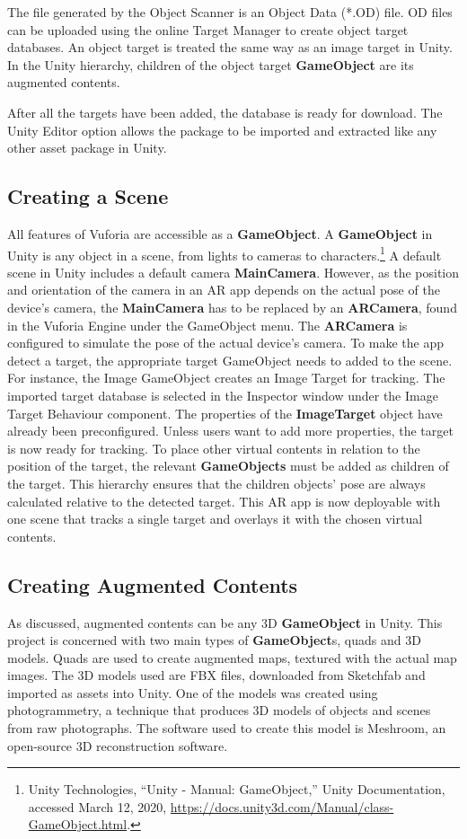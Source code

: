 The file generated by the Object Scanner is an Object Data (*.OD) file. OD files can be uploaded using the online Target Manager to create object target databases. An object target is treated the same way as an image target in Unity. In the Unity hierarchy, children of the object target \textbf{GameObject} are its augmented contents.

After all the targets have been added, the database is ready for download. The Unity Editor option allows the package to be imported and extracted like any other asset package in Unity.

\subsection{Creating a Scene}
All features of Vuforia are accessible as a \textbf{GameObject}. A \textbf{GameObject} in Unity is any object in a scene, from lights to cameras to characters.\footnote{Unity Technologies, “Unity - Manual: GameObject,” Unity Documentation, accessed March 12, 2020, \url{https://docs.unity3d.com/Manual/class-GameObject.html}.} A default scene in Unity includes a default camera \textbf{MainCamera}. However, as the position and orientation of the camera in an AR app depends on the actual pose of the device's camera, the \textbf{MainCamera} has to be replaced by an \textbf{ARCamera}, found in the Vuforia Engine under the GameObject menu. The \textbf{ARCamera} is configured to simulate the pose of the actual device's camera. To make the app detect a target, the appropriate target GameObject needs to added to the scene. For instance, the Image GameObject creates an Image Target for tracking. The imported target database is selected in the Inspector window under the Image Target Behaviour component. The properties of the \textbf{ImageTarget} object have already been preconfigured. Unless users want to add more properties, the target is now ready for tracking. To place other virtual contents in relation to the position of the target,  the relevant \textbf{GameObjects} must be added as children of the target. This hierarchy ensures that the children objects' pose are always calculated relative to the detected target. This AR app is now deployable with one scene that tracks a single target and overlays it with the chosen virtual contents.

\subsection{Creating Augmented Contents}
As discussed, augmented contents can be any 3D \textbf{GameObject} in Unity. This project is concerned with two main types of \textbf{GameObject}s, quads and 3D models. Quads are used to create augmented maps, textured with the actual map images. The 3D models used are FBX files, downloaded from Sketchfab and imported as assets into Unity. One of the models was created using photogrammetry, a technique that produces 3D models of objects and scenes from raw photographs. The software used to create this model is Meshroom, an open-source 3D reconstruction software.

